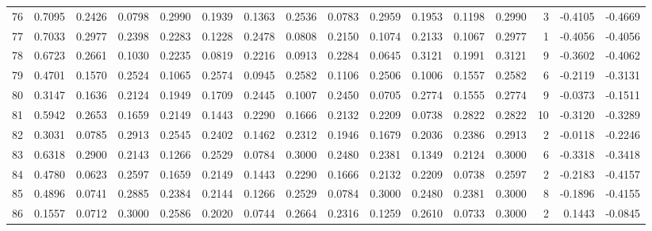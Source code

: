 \begin{tabular}{lrrrrrrrrrrrrrrr}
76  &      0.7095 &  0.2426 &  0.0798 &  0.2990 &  0.1939 &  0.1363 &  0.2536 &  0.0783 &  0.2959 &  0.1953 &   0.1198 &     0.2990 &      3 &                   -0.4105 &                    -0.4669 \\
77  &      0.7033 &  0.2977 &  0.2398 &  0.2283 &  0.1228 &  0.2478 &  0.0808 &  0.2150 &  0.1074 &  0.2133 &   0.1067 &     0.2977 &      1 &                   -0.4056 &                    -0.4056 \\
78  &      0.6723 &  0.2661 &  0.1030 &  0.2235 &  0.0819 &  0.2216 &  0.0913 &  0.2284 &  0.0645 &  0.3121 &   0.1991 &     0.3121 &      9 &                   -0.3602 &                    -0.4062 \\
79  &      0.4701 &  0.1570 &  0.2524 &  0.1065 &  0.2574 &  0.0945 &  0.2582 &  0.1106 &  0.2506 &  0.1006 &   0.1557 &     0.2582 &      6 &                   -0.2119 &                    -0.3131 \\
80  &      0.3147 &  0.1636 &  0.2124 &  0.1949 &  0.1709 &  0.2445 &  0.1007 &  0.2450 &  0.0705 &  0.2774 &   0.1555 &     0.2774 &      9 &                   -0.0373 &                    -0.1511 \\
81  &      0.5942 &  0.2653 &  0.1659 &  0.2149 &  0.1443 &  0.2290 &  0.1666 &  0.2132 &  0.2209 &  0.0738 &   0.2822 &     0.2822 &     10 &                   -0.3120 &                    -0.3289 \\
82  &      0.3031 &  0.0785 &  0.2913 &  0.2545 &  0.2402 &  0.1462 &  0.2312 &  0.1946 &  0.1679 &  0.2036 &   0.2386 &     0.2913 &      2 &                   -0.0118 &                    -0.2246 \\
83  &      0.6318 &  0.2900 &  0.2143 &  0.1266 &  0.2529 &  0.0784 &  0.3000 &  0.2480 &  0.2381 &  0.1349 &   0.2124 &     0.3000 &      6 &                   -0.3318 &                    -0.3418 \\
84  &      0.4780 &  0.0623 &  0.2597 &  0.1659 &  0.2149 &  0.1443 &  0.2290 &  0.1666 &  0.2132 &  0.2209 &   0.0738 &     0.2597 &      2 &                   -0.2183 &                    -0.4157 \\
85  &      0.4896 &  0.0741 &  0.2885 &  0.2384 &  0.2144 &  0.1266 &  0.2529 &  0.0784 &  0.3000 &  0.2480 &   0.2381 &     0.3000 &      8 &                   -0.1896 &                    -0.4155 \\
86  &      0.1557 &  0.0712 &  0.3000 &  0.2586 &  0.2020 &  0.0744 &  0.2664 &  0.2316 &  0.1259 &  0.2610 &   0.0733 &     0.3000 &      2 &                    0.1443 &                    -0.0845 \\

\end{tabular}

